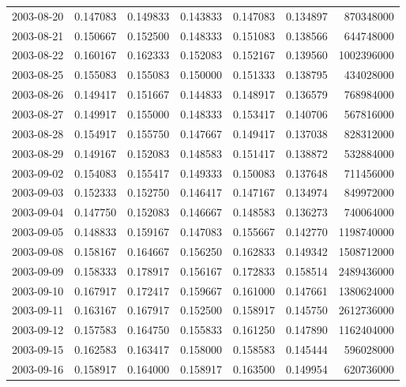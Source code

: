 \begin{tabular}{lrrrrrr}
2003-08-20 &    0.147083 &    0.149833 &    0.143833 &    0.147083 &    0.134897 &   870348000 \\
2003-08-21 &    0.150667 &    0.152500 &    0.148333 &    0.151083 &    0.138566 &   644748000 \\
2003-08-22 &    0.160167 &    0.162333 &    0.152083 &    0.152167 &    0.139560 &  1002396000 \\
2003-08-25 &    0.155083 &    0.155083 &    0.150000 &    0.151333 &    0.138795 &   434028000 \\
2003-08-26 &    0.149417 &    0.151667 &    0.144833 &    0.148917 &    0.136579 &   768984000 \\
2003-08-27 &    0.149917 &    0.155000 &    0.148333 &    0.153417 &    0.140706 &   567816000 \\
2003-08-28 &    0.154917 &    0.155750 &    0.147667 &    0.149417 &    0.137038 &   828312000 \\
2003-08-29 &    0.149167 &    0.152083 &    0.148583 &    0.151417 &    0.138872 &   532884000 \\
2003-09-02 &    0.154083 &    0.155417 &    0.149333 &    0.150083 &    0.137648 &   711456000 \\
2003-09-03 &    0.152333 &    0.152750 &    0.146417 &    0.147167 &    0.134974 &   849972000 \\
2003-09-04 &    0.147750 &    0.152083 &    0.146667 &    0.148583 &    0.136273 &   740064000 \\
2003-09-05 &    0.148833 &    0.159167 &    0.147083 &    0.155667 &    0.142770 &  1198740000 \\
2003-09-08 &    0.158167 &    0.164667 &    0.156250 &    0.162833 &    0.149342 &  1508712000 \\
2003-09-09 &    0.158333 &    0.178917 &    0.156167 &    0.172833 &    0.158514 &  2489436000 \\
2003-09-10 &    0.167917 &    0.172417 &    0.159667 &    0.161000 &    0.147661 &  1380624000 \\
2003-09-11 &    0.163167 &    0.167917 &    0.152500 &    0.158917 &    0.145750 &  2612736000 \\
2003-09-12 &    0.157583 &    0.164750 &    0.155833 &    0.161250 &    0.147890 &  1162404000 \\
2003-09-15 &    0.162583 &    0.163417 &    0.158000 &    0.158583 &    0.145444 &   596028000 \\
2003-09-16 &    0.158917 &    0.164000 &    0.158917 &    0.163500 &    0.149954 &   620736000 \\

\end{tabular}
